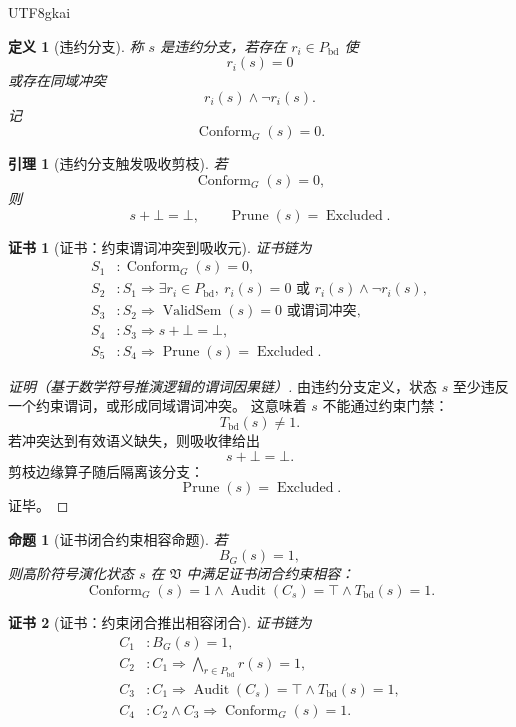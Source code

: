\documentclass[12pt]{article}
\newtheorem{definition}{定义}[section]
\newtheorem{proposition}{命题}[section]
\newtheorem{lemma}{引理}[section]
\newtheorem{Certificate}{证书}[section]
\newcommand{\Vsys}{\mathfrak V}
\DeclareMathOperator{\Audit}{Audit}
\DeclareMathOperator{\Prune}{Prune}
\DeclareMathOperator{\ValidSem}{ValidSem}
\DeclareMathOperator{\Excluded}{Excluded}
\DeclareMathOperator{\Conform}{Conform}
\begin{document}
\begin{CJK*}{UTF8}{gkai}
\begin{definition}[违约分支]
\label{def:tex59-violating-branch}
称 \(s\) 是违约分支，若存在 \(r_i\in P_{\mathrm{bd}}\) 使
\[
  r_i(s)=0
\]
或存在同域冲突
\[
  r_i(s)\wedge\neg r_i(s).
\]
记
\[
  \Conform_G(s)=0.
\]
\end{definition}

\begin{lemma}[违约分支触发吸收剪枝]
\label{lem:tex59-violating-absorbed}
若
\[
  \Conform_G(s)=0,
\]
则
\[
  s+\bot=\bot,
  \qquad
  \Prune(s)=\Excluded.
\]
\end{lemma}

\begin{Certificate}[证书：约束谓词冲突到吸收元]
\label{cert:tex59-violating-absorbed}
证书链为
\[
\begin{aligned}
  S_1 &: \Conform_G(s)=0,\\
  S_2 &: S_1\Rightarrow
       \exists r_i\in P_{\mathrm{bd}},\ r_i(s)=0
       \text{ 或 }r_i(s)\wedge\neg r_i(s),\\
  S_3 &: S_2\Rightarrow \ValidSem(s)=0\text{ 或谓词冲突},\\
  S_4 &: S_3\Rightarrow s+\bot=\bot,\\
  S_5 &: S_4\Rightarrow \Prune(s)=\Excluded.
\end{aligned}
\]
\end{Certificate}

\begin{proof}[证明（基于数学符号推演逻辑的谓词因果链）]
由违约分支定义，状态 \(s\) 至少违反一个约束谓词，或形成同域谓词冲突。
这意味着 \(s\) 不能通过约束门禁：
\[
  T_{\mathrm{bd}}(s)\ne1.
\]
若冲突达到有效语义缺失，则吸收律给出
\[
  s+\bot=\bot.
\]
剪枝边缘算子随后隔离该分支：
\[
  \Prune(s)=\Excluded.
\]
证毕。
\end{proof}

\begin{proposition}[证书闭合约束相容命题]
\label{prop:tex59-certified-conformance}
若
\[
  B_G(s)=1,
\]
则高阶符号演化状态 \(s\) 在 \(\Vsys\) 中满足证书闭合约束相容：
\[
  \Conform_G(s)=1
  \wedge
  \Audit(C_s)=\top
  \wedge
  T_{\mathrm{bd}}(s)=1.
\]
\end{proposition}

\begin{Certificate}[证书：约束闭合推出相容闭合]
\label{cert:tex59-certified-conformance}
证书链为
\[
\begin{aligned}
  C_1 &: B_G(s)=1,\\
  C_2 &: C_1\Rightarrow
       \bigwedge_{r\in P_{\mathrm{bd}}}r(s)=1,\\
  C_3 &: C_1\Rightarrow \Audit(C_s)=\top\wedge T_{\mathrm{bd}}(s)=1,\\
  C_4 &: C_2\wedge C_3\Rightarrow \Conform_G(s)=1.
\end{aligned}
\]
\end{Certificate}


\end{CJK*}
\end{document}
